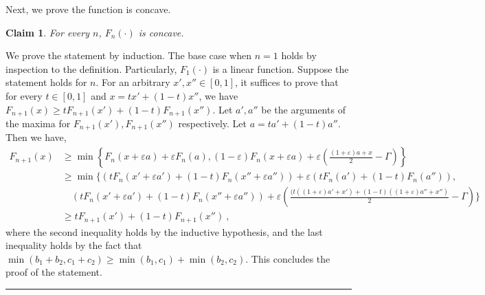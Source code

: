 \documentclass[11pt,letterpaper]{article}
\newenvironment{proof}{{\bf Proof:  }}{\hfill\rule{2mm}{2mm}\vspace*{5pt}}
\newtheorem{claim}{Claim}[section]
\newcommand{\eps}{\varepsilon}
\begin{document}
Next, we prove the function is concave.
\begin{claim}
\label{cl:concave}
For every $n$, $F_n(\cdot)$ is concave.
\end{claim}
\begin{proof}
We prove the statement by induction. The base case when $n=1$ holds by inspection to the definition. Particularly, $F_1(\cdot)$ is a linear function.
Suppose the statement holds for $n$. For an arbitrary $x',x'' \in [0,1]$, it suffices to prove that for every $t \in [0,1]$ and $x=t x'+ (1-t)x''$, we have $F_{n+1}(x) \ge t F_{n+1}(x')+ (1-t)F_{n+1}(x'')$. Let $a',a''$ be the arguments of the maxima for $F_{n+1}(x'), F_{n+1}(x'')$ respectively. Let $a=t a'+ (1-t)a''$. Then we have,
\begin{align*}
F_{n+1}(x) & \ge \min \left\{F_n(x+\eps a)+\eps F_n(a), (1-\eps) F_n(x+\eps a) + \eps \left(\frac{(1+\eps)a + x}{2} - \Gamma \right) \right\} \\
& \ge \min \bigg\{ \left(t F_n(x'+\eps a') + (1-t)F_n(x''+\eps a'')\right) +  \eps \left(tF_n(a') + (1-t)F_n(a'')\right) , \\
& \quad \left(tF_n(x'+\eps a')+(1-t)F_n(x''+\eps a'') \right) + \eps \left(\frac{(t((1+\eps)a'+x') + (1-t)((1+\eps)a''+x'')}{2} - \Gamma \right) \bigg\} \\
& \ge tF_{n+1}(x') + (1-t)F_{n+1}(x'')~,
\end{align*}
where the second inequality holds by the inductive hypothesis, and the last inequality holds by the fact that $\min(b_1+b_2,c_1+c_2) \ge \min(b_1,c_1) + \min(b_2,c_2)$. This concludes the proof of the statement.
\end{proof}
\end{document}
